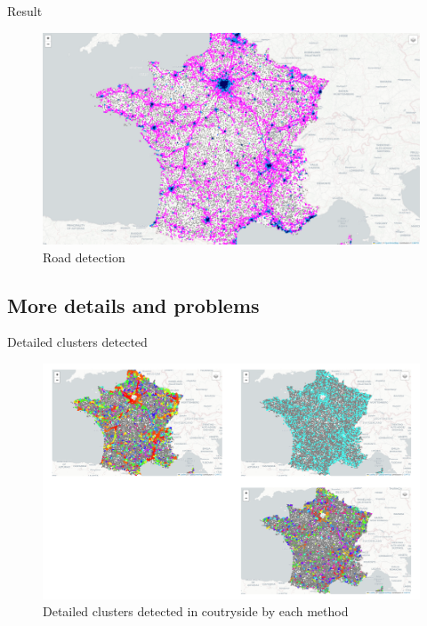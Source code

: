 \begin{frame}{Result}
    \begin{figure}
        \includegraphics[height=0.6\paperheight]{images/cartes/road_detection/res.png}
        \caption{Road detection}
    \end{figure}
\end{frame}

\subsection{More details and problems}
\insertsubsectionframe

\begin{frame}{Detailed clusters detected}
    \begin{figure}
        \includegraphics[height=0.6\paperheight]{images/clusters_road_detection.html.png}
        \caption{Detailed clusters detected in coutryside by each method}
    \end{figure}
\end{frame}

